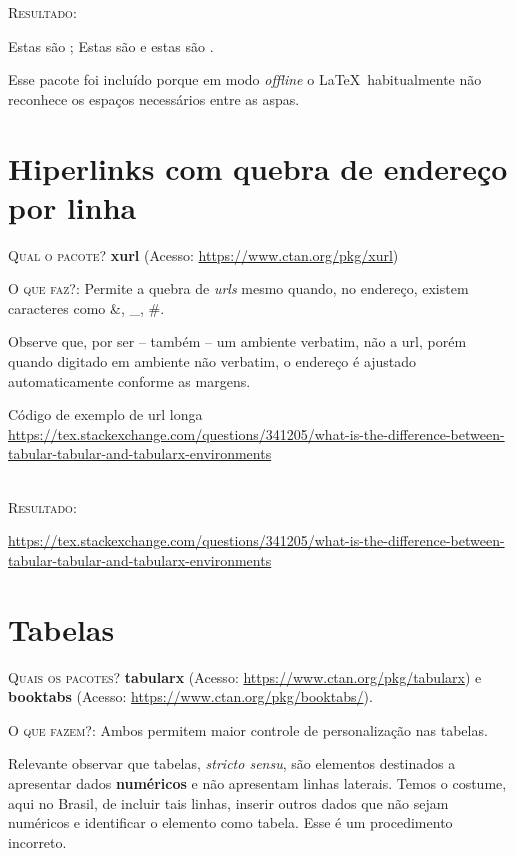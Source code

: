 \documentclass[a4paper,12pt,oneside,openright,extrafontsizes,openbib]{memoir}
\begin{document}
{\textsc{Resultado}:

Estas são ; Estas são  e estas são .

Esse pacote foi incluído porque em modo \textit{offline} o \LaTeX\ habitualmente não reconhece os espaços necessários entre as aspas.
\chapter{Hiperlinks com quebra de endereço por linha}

\textsc{Qual o pacote?} \textbf{xurl} (Acesso: \url{https://www.ctan.org/pkg/xurl})

\textsc{O que faz?}: Permite a quebra de \textit{urls} mesmo quando, no endereço, existem caracteres como \&, \_, \#.

Observe que, por ser -- também -- um ambiente verbatim, não  a url, porém quando digitado em ambiente não verbatim, o endereço é ajustado automaticamente conforme as margens.

\begin{codex}{Código de exemplo de url longa}
\url{https://tex.stackexchange.com/questions/341205/what-is-the-difference-between-tabular-tabular-and-tabularx-environments}
\end{codex}
\ \\

\textsc{Resultado:}

\url{https://tex.stackexchange.com/questions/341205/what-is-the-difference-between-tabular-tabular-and-tabularx-environments}

\chapter{Tabelas}

\textsc{Quais os pacotes?} \textbf{tabularx} (Acesso: \url{https://www.ctan.org/pkg/tabularx}) e \textbf{booktabs} (Acesso: \url{https://www.ctan.org/pkg/booktabs/}).

\textsc{O que fazem?}: Ambos permitem maior controle de personalização nas tabelas. 

Relevante observar que tabelas, \textit{stricto sensu}, são elementos destinados a apresentar dados \textbf{numéricos} e não apresentam linhas laterais. Temos o costume, aqui no Brasil, de incluir tais linhas, inserir outros dados que não sejam numéricos e identificar o elemento como tabela. Esse é um procedimento incorreto. 

}
\end{document}

